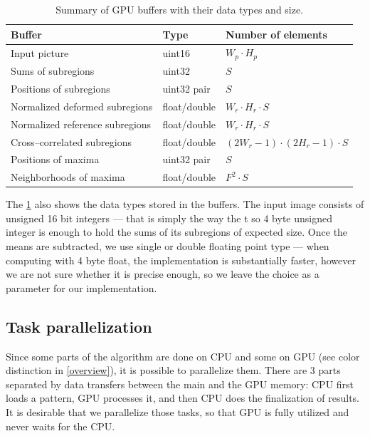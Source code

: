 \begin{table}[]
	\begin{tabular}{@{}lll@{}}
		\toprule
		Buffer                          & Type         & Number of elements             \\ \midrule
		Input picture                   & uint16       & $W_p \cdot H_p$                \\
		Sums of subregions              & uint32       & $S$                            \\
		Positions of subregions         & uint32 pair  & $S$                            \\
		Normalized deformed subregions  & float/double & $W_r \cdot H_r \cdot S$        \\
		Normalized reference subregions & float/double & $W_r \cdot H_r \cdot S$        \\
		Cross--correlated subregions    & float/double & $(2W_r-1)\cdot(2H_r-1)\cdot S$ \\
		Positions of maxima             & uint32 pair  & $S$                            \\
		Neighborhoods of maxima         & float/double & $F^2 \cdot S $                 \\ \bottomrule
	\end{tabular}
	\caption{Summary of GPU buffers with their data types and size.}
	\label{buftypes}
\end{table}



The \cref{buftypes} also shows the data types stored in the buffers. The input image consists of unsigned 16 bit integers --- that is simply the way the t so 4 byte unsigned integer is enough to hold the sums of its subregions of expected size. Once the means are subtracted, we use single or double floating point type --- when computing with 4 byte float, the implementation is substantially faster, however we are not sure whether it is precise enough, so we leave the choice as a parameter for our implementation.


\subsection{Task parallelization}
\label{task-paralelization}


Since some parts of the algorithm are done on CPU and some on GPU (see color distinction in \cref{overview}), it is possible to parallelize them. There are 3 parts separated by data transfers between the main and the GPU memory: CPU first loads a pattern, GPU processes it, and then CPU does the finalization of results. It is desirable that we parallelize those tasks, so that GPU is fully utilized and never waits for the CPU.

